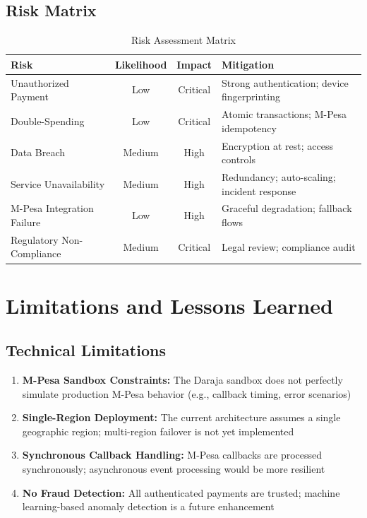 \documentclass[12pt, a4paper, twoside, openright]{report}
\begin{document}
\subsection{Risk Matrix}

\begin{table}[H]
    \centering
    \begin{tabularx}{\textwidth}{|l|c|c|l|}
    \hline
    \textbf{Risk} & \textbf{Likelihood} & \textbf{Impact} & \textbf{Mitigation} \\
    \hline
    Unauthorized Payment & Low & Critical & Strong authentication; device fingerprinting \\
    \hline
    Double-Spending & Low & Critical & Atomic transactions; M-Pesa idempotency \\
    \hline
    Data Breach & Medium & High & Encryption at rest; access controls \\
    \hline
    Service Unavailability & Medium & High & Redundancy; auto-scaling; incident response \\
    \hline
    M-Pesa Integration Failure & Low & High & Graceful degradation; fallback flows \\
    \hline
    Regulatory Non-Compliance & Medium & Critical & Legal review; compliance audit \\
    \hline
    \end{tabularx}
    \caption{Risk Assessment Matrix}
\end{table}

\section{Limitations and Lessons Learned}

\subsection{Technical Limitations}

\begin{enumerate}
    \item \textbf{M-Pesa Sandbox Constraints:} The Daraja sandbox does not perfectly simulate production M-Pesa behavior (e.g., callback timing, error scenarios)
    \item \textbf{Single-Region Deployment:} The current architecture assumes a single geographic region; multi-region failover is not yet implemented
    \item \textbf{Synchronous Callback Handling:} M-Pesa callbacks are processed synchronously; asynchronous event processing would be more resilient
    \item \textbf{No Fraud Detection:} All authenticated payments are trusted; machine learning-based anomaly detection is a future enhancement
\end{enumerate}
\end{document}
